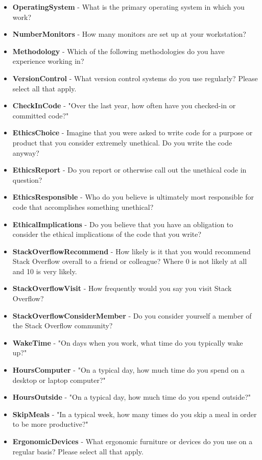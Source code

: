 \begin{appendices}
\begin{itemize}
        \item \textbf{OperatingSystem} - What is the primary operating system in which you work?
        \item \textbf{NumberMonitors} - How many monitors are set up at your workstation?
        \item \textbf{Methodology} - Which of the following methodologies do you have experience working in?
        \item \textbf{VersionControl} - What version control systems do you use regularly? Please select all that apply.
        \item \textbf{CheckInCode} - "Over the last year, how often have you checked-in or committed code?"
        \item \textbf{EthicsChoice} - Imagine that you were asked to write code for a purpose or product that you consider extremely unethical. Do you write the code anyway?
        \item \textbf{EthicsReport} - Do you report or otherwise call out the unethical code in question?
        \item \textbf{EthicsResponsible} - Who do you believe is ultimately most responsible for code that accomplishes something unethical?
        \item \textbf{EthicalImplications} - Do you believe that you have an obligation to consider the ethical implications of the code that you write?
        \item \textbf{StackOverflowRecommend} - How likely is it that you would recommend Stack Overflow overall to a friend or colleague? Where 0 is not likely at all and 10 is very likely.
        \item \textbf{StackOverflowVisit} - How frequently would you say you visit Stack Overflow?
        \item \textbf{StackOverflowConsiderMember} - Do you consider yourself a member of the Stack Overflow community?
        \item \textbf{WakeTime} - "On days when you work, what time do you typically wake up?"
        \item \textbf{HoursComputer} - "On a typical day, how much time do you spend on a desktop or laptop computer?"
        \item \textbf{HoursOutside} - "On a typical day, how much time do you spend outside?"
        \item \textbf{SkipMeals} - "In a typical week, how many times do you skip a meal in order to be more productive?"
        \item \textbf{ErgonomicDevices} - What ergonomic furniture or devices do you use on a regular basis? Please select all that apply.

\end{itemize}
\end{appendices}
